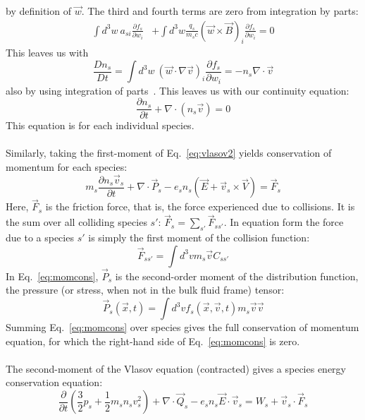 by definition of $\vec w$. The third and fourth terms are zero from integration by parts:
\begin{align*}
  \int d^3w~a_{si}\frac{\partial f_s}{\partial w_i}&+\int d^3w\frac{q_s}{m_sc}(\vec w\times\vec B)_i\frac{\partial f_s}{\partial w_i}=0
\end{align*}
This leaves us with
\begin{equation*}
  \frac{Dn_s}{Dt}=\int d^3w~(\vec w\cdot\nabla \vec v)_i\frac{\partial f_s}{\partial w_i}=-n_s\nabla\cdot\vec v
\end{equation*}
also by using integration of parts~\cite{KunzLecture1}. This leaves us with our continuity equation:
\begin{equation}
  \frac{\partial n_s}{\partial t}+\nabla\cdot(n_s\vec v)=0\label{eq:ncons}
\end{equation}
This equation is for each individual species. \\
\\
Similarly, taking the first-moment of Eq.~\ref{eq:vlasov2} yields conservation of momentum for each species:
\begin{equation}
  m_s\frac{\partial n_s\vec v_s}{\partial t}+\nabla\cdot\vec P_s-e_sn_s(\vec E+\vec v_s\times\vec V)=\vec F_s \label{eq:momcons}
\end{equation}
Here, $\vec F_s$ is the friction force, that is, the force experienced due to collisions. It is the sum over all colliding species $s'$: $\vec F_{s}=\sum_{s'}\vec F_{ss'}$. In equation form the force due to a species $s'$ is simply the first moment of the collision function:
\begin{equation}
  \vec F_{ss'}=\int d^3vm_s\vec vC_{ss'}
\end{equation}
In Eq.~\ref{eq:momcons}, $\vec P_s$ is the second-order moment of the distribution function, the pressure (or stress, when not in the bulk fluid frame) tensor:
\begin{equation}
  \vec P_s(\vec x,t)=\int d^3vf_s(\vec x,\vec v,t)m_s\vec v\vec v
\end{equation}
Summing Eq.~\ref{eq:momcons} over species gives the full conservation of momentum equation, for which the right-hand side of Eq.~\ref{eq:momcons} is zero.\\
\\
The second-moment of the Vlasov equation (contracted) gives a species energy conservation equation:
\begin{equation}
  \frac{\partial}{\partial t}\left(\frac32p_s+\frac12m_sn_sv_s^2\right)+\nabla\cdot\vec Q_s-e_sn_s\vec E\cdot\vec v_s=W_s+\vec v_s\cdot \vec F_s \label{eq:energycons}
\end{equation}
